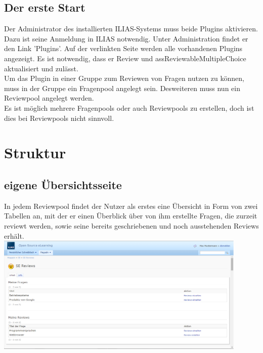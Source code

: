 \documentclass[12pt,a4paper]{scrreprt}
\begin{document}
\section{Der erste Start}
Der Administrator des installierten ILIAS-Systems muss beide Plugins aktivieren. Dazu ist seine Anmeldung in ILIAS notwendig. Unter Administration findet er den Link 'Plugins'. Auf der verlinkten Seite werden alle vorhandenen Plugins angezeigt. Es ist notwendig, dass er Review und assReviewableMultipleChoice aktualisiert und zulässt. \\
	Um das Plugin in einer Gruppe zum Reviewen von Fragen nutzen zu können, muss in der Gruppe ein Fragenpool angelegt sein. Desweiteren muss nun ein Reviewpool angelegt werden.\\
	Es ist möglich mehrere Fragenpools oder auch Reviewpools zu erstellen, doch ist dies bei Reviewpools nicht sinnvoll. 

\chapter{Struktur}

\section{eigene \"Ubersichtsseite}
In jedem Reviewpool findet der Nutzer als erstes eine Übersicht in Form von zwei Tabellen an, mit der er einen Überblick über von ihm erstellte Fragen, die zurzeit reviewt werden, sowie seine bereits geschriebenen und noch ausstehenden Reviews erhält. 	\\
\includegraphics[width=0.9\textwidth]{uebersicht.png}
\end{document}
